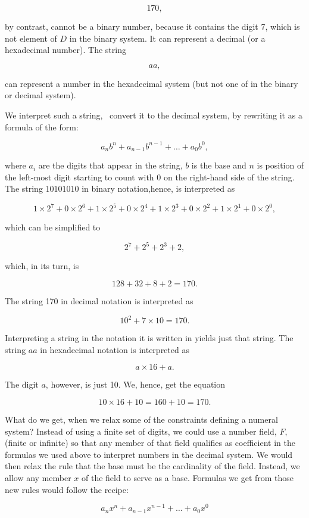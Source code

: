 \documentclass[tikz]{scrreprt}
\begin{document}
\[
170,
\]

by contrast, cannot be a binary number, because
it contains the digit 7, which is not element of $D$
in the binary system.
It can represent a decimal (or a hexadecimal number).
The string

\[
aa,
\]

can represent a number in the hexadecimal system
(but not one of in the binary or decimal system).

We interpret such a string, \ie\ convert it
to the decimal system, by rewriting it 
as a formula of the form:

\[
a_nb^n + a_{n-1}b^{n-1} + \dots + a_0b^0,
\]

where $a_i$ are the digits that appear in the string,
$b$ is the base and $n$ is position of the left-most digit
starting to count with 0 on the right-hand side of the string.
The string $10101010$ in binary notation,hence, is interpreted as

\[
1\times 2^7 + 0\times 2^6 + 1\times 2^5 + 0\times 2^4 + 
1\times 2^3 + 0\times 2^2 + 1\times 2^1 + 0\times 2^0,
\]

which can be simplified to

\[
2^7 + 2^5 + 2^3 + 2,
\]

which, in its turn, is

\[
128 + 32 + 8 + 2 = 170.
\]

The string 170 in decimal notation is interpreted as

\[
10^2 + 7\times 10 = 170.
\]

Interpreting a string in the notation it is written in
yields just that string.
The string $aa$ in hexadecimal notation is interpreted as

\[
a\times 16 + a.
\]

The digit $a$, however, is just 10. We, hence, get the equation

\[
10\times 16 + 10 = 160 + 10 = 170.
\]

What do we get, when we relax some of the constraints
defining a numeral system?
Instead of using a finite set of digits,
we could use a number field, $F$, (finite or infinite)
so that any member of that field qualifies as coefficient
in the formulas we used above to interpret numbers
in the decimal system. We would then relax the rule
that the base must be the cardinality of the field.
Instead, we allow any member $x$ of the field 
to serve as a base.
Formulas we get from those new rules would follow the recipe:

\[
a_nx^n + a_{n-1}x^{n-1} + \dots + a_0x^0
\]
\end{document}
